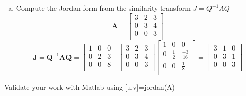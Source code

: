 \documentclass{article}
\begin{document}
\begin{enumerate}[a)]
\item Compute the Jordan form from the similarity transform $J = Q^{-1}AQ$
$$
\mathbf{A}
=
\begin{bmatrix}
3 & 2 & 3 \\
0 & 3 & 4 \\
0 & 0 & 3 \\
\end{bmatrix}
$$
\newline
\newline
$$
\mathbf{J}
=
\mathbf{Q}^{-1}
\mathbf{A}
\mathbf{Q}
=
\begin{bmatrix}
1 & 0 & 0 \\
0 & 2 & 3 \\
0 & 0 & 8 \\
\end{bmatrix}
\begin{bmatrix}
3 & 2 & 3 \\
0 & 3 & 4 \\
0 & 0 & 3 \\
\end{bmatrix}
\begin{bmatrix}
1 & 0 & 0 \\
0 & \frac{1}{2} & \frac{-3}{16} \\
0 & 0 & \frac{1}{8} \\
\end{bmatrix}
=
\begin{bmatrix}
3 & 1 & 0 \\
0 & 3 & 1 \\
0 & 0 & 3 \\
\end{bmatrix}
$$
\end{enumerate}
Validate your work with Matlab using [u,v]=jordan(A)
\end{document}

